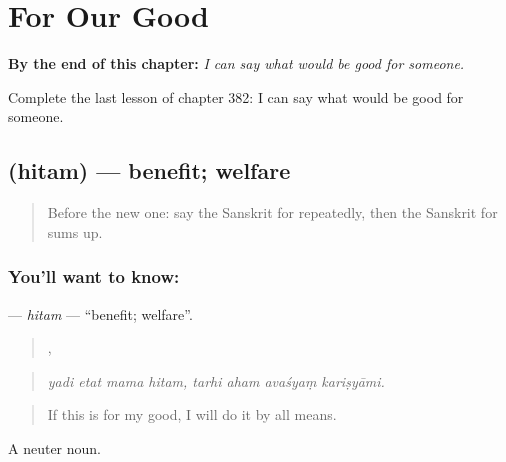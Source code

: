 
\chapter{For Our Good}
\label{ch:sa-for-our-good}

\begin{chapteropening}
\textbf{By the end of this chapter:} \emph{I can say what would be good for someone.}

Complete the last lesson of chapter 382: I can say what would be good for someone.
\end{chapteropening}

\section[\texorpdfstring{\sk{हितम्} (hitam)}{हितम् (hitam)}]{ (hitam) — benefit; welfare}

\label{lesson:SA-C382-hitam}



\begin{quote}
Before the new one: say the Sanskrit for repeatedly, then the Sanskrit for sums up.
\end{quote}

\subsection*{You'll want to know: }
\textbf{} — \emph{hitam} — \textquotedblleft{}benefit; welfare\textquotedblright{}.

\begin{quote}
   ,    
\end{quote}

\begin{quote}
\emph{yadi etat mama hitam, tarhi aham avaśyaṃ kariṣyāmi.}
\end{quote}

\begin{quote}
If this is for my good, I will do it by all means.
\end{quote}

A neuter noun.

